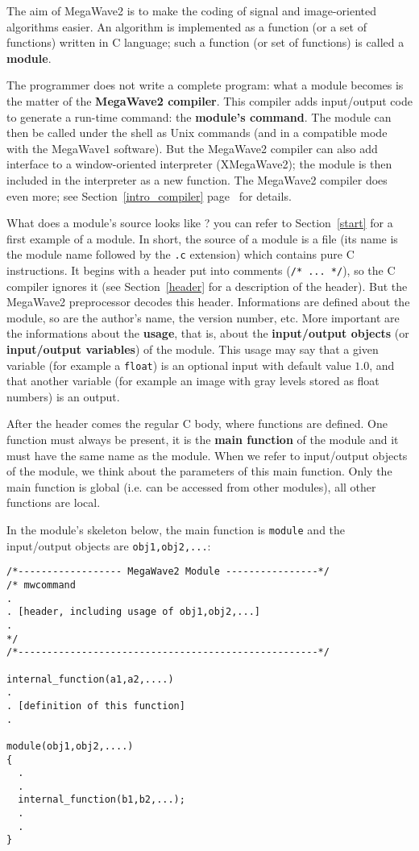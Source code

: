 The aim of MegaWave2 is to make the coding of signal and image-oriented algorithms easier.
An algorithm is implemented as a function (or a set of functions) written in C language; such a function (or set of functions) is called a {\bf module}.

The programmer does not write a complete program: what a module becomes is the matter of the {\bf MegaWave2 compiler}. 
This compiler adds input/output code to generate a run-time command: the {\bf module's command}. The module can then be called under the shell as Unix commands (and in a compatible mode with the MegaWave1 software). 
But the MegaWave2 compiler can also add interface to a window-oriented interpreter (XMegaWave2); the module is then included in the interpreter as a new function.
The MegaWave2 compiler does even more; see Section~\ref{intro_compiler} page~\pageref{intro_compiler} for details.

What does a module's source looks like ? you can refer to Section~\ref{start} for a first example of a module.
In short, the source of a module is a file (its name is the module name followed by the \verb+.c+ extension) which contains pure C instructions.
It begins with a header put into comments (\verb+/* ... */+), so the C compiler ignores it (see Section~\ref{header} for a description of the header).
But the MegaWave2 preprocessor decodes this header. 
Informations are defined about the module, so are the author's name, the version number, etc. 
More important are the informations about the {\bf usage}, that is, about the {\bf input/output objects} (or {\bf input/output variables}) of the module. 
This usage may say that a given variable (for example a \verb+float+) is an optional input
with default value $1.0$, and that another variable (for example an image with gray levels stored as {\sf float} numbers) is an output.

After the header comes the regular C body, where functions are defined.
One function must always be present, it is the {\bf main function} of the module and it must have the same name as the module. 
When we refer to input/output objects of the module, we think about the parameters 
of this main function. 
Only the main function is global (i.e. can be accessed from other modules), all other functions are local.

In the module's skeleton below, the main function is \verb+module+ and the input/output objects are \verb+obj1,obj2,...+:
{\small
\begin{verbatim}
/*------------------ MegaWave2 Module ----------------*/
/* mwcommand
.
. [header, including usage of obj1,obj2,...]
.
*/
/*----------------------------------------------------*/

internal_function(a1,a2,....)
.
. [definition of this function]
.

module(obj1,obj2,....)
{
  .
  .
  internal_function(b1,b2,...);
  .
  .
}
\end{verbatim}
}

